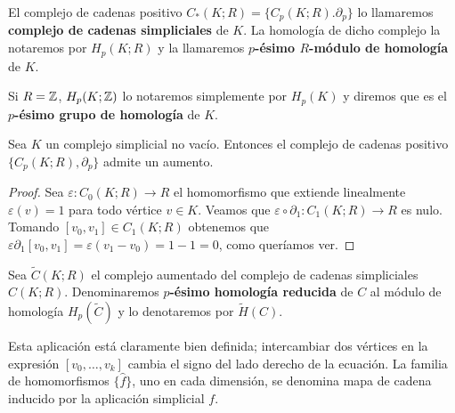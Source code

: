 \begin{definicion}
	El complejo de cadenas positivo $C_*(K;R) = \{C_p(K;R). \partial_p\}$ lo llamaremos \textbf{complejo de cadenas simpliciales} de $K$. La homología de dicho complejo la notaremos por $H_p(K;R)$ y la llamaremos \textbf{$p$-ésimo $R$-módulo de homología} de $K$.
\end{definicion}
Si $R=\mathbb{Z}$, $H_p(K;\mathbb{Z})$ lo notaremos simplemente por $H_p(K)$ y diremos que es el \textbf{$p$-ésimo grupo de homología} de $K$.
\begin{proposicion}
	\label{prop:aumento}
	Sea $K$ un complejo simplicial no vacío. Entonces el complejo de cadenas positivo $\{ C_p(K;R), \partial_p \}$ admite un aumento.
\end{proposicion}
\begin{proof}
	Sea $\varepsilon: C_0(K;R) \to R$ el homomorfismo que extiende linealmente $\varepsilon(v) = 1$ para todo vértice $v \in K$. Veamos que $\varepsilon \circ \partial_1 : C_1(K;R) \to R$ es nulo. Tomando $[v_0,v_1] \in C_1(K;R)$ obtenemos que $\varepsilon \partial_1[v_0,v_1] = \varepsilon(v_1 - v_0) = 1-1 = 0$, como queríamos ver.
\end{proof}
\begin{definicion}
	Sea $\widetilde{C}(K;R)$ el complejo aumentado del complejo de cadenas simpliciales $C(K;R)$. Denominaremos \textbf{$p$-ésimo homología reducida} de $C$ al módulo de homología $H_p(\widetilde{C})$ y lo denotaremos por $\widetilde{H}(C)$.
\end{definicion}
Esta aplicación está claramente bien definida; intercambiar dos vértices en la expresión $[v_0, \ldots, v_k]$ cambia el signo del lado derecho de la ecuación. La familia de homomorfismos $\{\hat{f}\}$, uno en cada dimensión, se denomina mapa de cadena inducido por la aplicación simplicial $f$.

